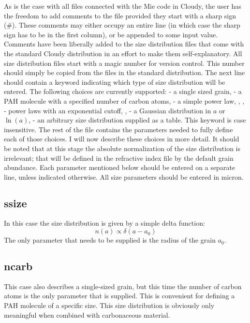 As is the case with all files connected with the Mie code in Cloudy, the user
has the freedom to add comments to the file provided they start with a sharp
sign (\#). These comments may either occupy an entire line (in which case the
sharp sign has to be in the first column), or be appended to some input value.
Comments have been liberally added to the size distribution files that come
with the standard Cloudy distribution in an effort to make them
self-explanatory. All size distribution files start with a magic number for
version control. This number should simply be copied from the files in the
standard distribution. The next line should contain a keyword indicating which
type of size distribution will be entered. The following choices are currently
supported:  - a single sized grain,  - a
PAH molecule with a specified number of carbon atoms,  - a
simple power law, , ,  -
power laws with an exponential cutoff, ,
 - a Gaussian distribution in $a$ or $\ln(a)$,
 - an arbitrary size distribution supplied as a table. This
keyword is case insensitive. The rest of the file contains the parameters
needed to fully define each of those choices. I will now describe these
choices in more detail. It should be noted that at this stage the absolute
normalization of the size distribution is irrelevant; that will be defined in
the refractive index file by the default grain abundance. Each parameter
mentioned below should be entered on a separate line, unless indicated
otherwise. All size parameters should be entered in micron.

\subsection{ssize}

In this case the size distribution is given by a simple delta function:
\[ n(a) \propto \delta(a - a_0) \]
The only parameter that needs to be supplied is the radius of the grain
$a_0$.

\subsection{ncarb}

This case also describes a single-sized grain, but this time the number
of carbon atoms is the only parameter that is supplied. This is convenient
for defining a PAH molecule of a specific size. This size distribution is
obviously only meaningful when combined with carbonaceous material.

